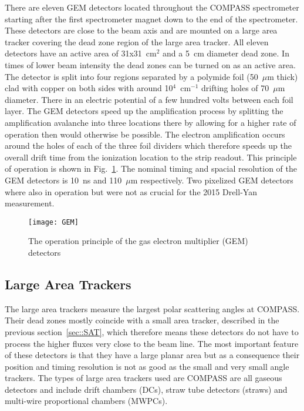 There are eleven GEM detectors located throughout the COMPASS spectrometer
starting after the first spectrometer magnet down to the end of the
spectrometer.  These detectors are close to the beam axis and are mounted on a
large area tracker covering the dead zone region of the large area tracker.  All
eleven detectors have an active area of 31x31~cm$^2$ and a 5~cm diameter dead
zone.  In times of lower beam intensity the dead zones can be turned on as an
active area.  The detector is split into four regions separated by a polymide
foil (50~$\mu$m thick) clad with copper on both sides with around
10$^4$~cm$^{-1}$ drifting holes of 70~$\mu$m diameter.  There in an electric
potential of a few hundred volts between each foil layer.  The GEM detectors
speed up the amplification process by splitting the amplification avalanche into
three locations there by allowing for a higher rate of operation then would
otherwise be possible.  The electron amplification occurs around the holes of
each of the three foil dividers which therefore speeds up the overall drift time
from the ionization location to the strip readout.  This principle of operation
is shown in Fig.~\ref{fig::GEM}.  The nominal timing and spacial resolution of
the GEM detectors is 10~ns and 110~$\mu$m respectively.  Two pixelized GEM
detectors where also in operation but were not as crucial for the 2015 Drell-Yan
measurement.

\begin{figure}[h!t]
  \centering
  \texttt{[image: GEM]}
  \caption{The operation principle of the gas electron multiplier (GEM)
    detectors}
  \label{fig::GEM}
\end{figure}

\subsection{Large Area Trackers}
The large area trackers measure the largest polar scattering angles at COMPASS.
Their dead zones mostly coincide with a small area tracker, described in the
previous section~\ref{sec::SAT}, which therefore means these detectors do not
have to process the higher fluxes very close to the beam line.  The most
important feature of these detectors is that they have a large planar area but
as a consequence their position and timing resolution is not as good as the
small and very small angle trackers.  The types of large area trackers used are
COMPASS are all gaseous detectors and include drift chambers (DCs), straw tube
detectors (straws) and multi-wire proportional chambers (MWPCs). \par

